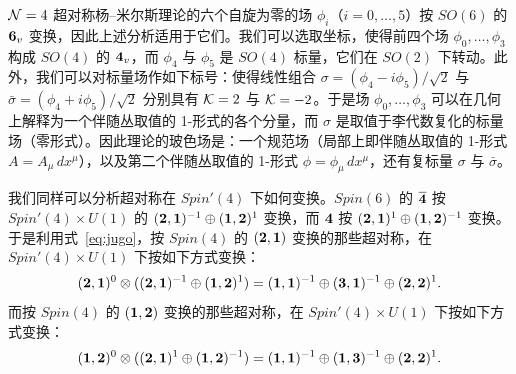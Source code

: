 ${\EUN}=4$ 超对称杨--米尔斯理论的六个自旋为零的场 $\phi_i$（$i=0,\dots,5$）按 $SO(6)$ 的 ${\bf 6_v}$ 变换，因此上述分析适用于它们。我们可以选取坐标，使得前四个场 $\phi_0,\dots,\phi_3$ 构成 $SO(4)$ 的 ${\bf 4_v}$，而 $\phi_4$ 与 $\phi_5$ 是 $SO(4)$ 标量，它们在 $SO(2)$ 下转动。此外，我们可以对标量场作如下标号：使得线性组合 $\sigma=(\phi_4-i\phi_5)/\sqrt 2$ 与 $\bar\sigma=(\phi_4+i\phi_5)/\sqrt 2$ 分别具有 ${\EUK}=2$ 与 ${\EUK}=-2$。于是场 $\phi_0,\dots,\phi_3$ 可以在几何上解释为一个伴随丛取值的 1-形式的各个分量，而 $\sigma$ 是取值于李代数复化的标量场（零形式）。因此理论的玻色场是：一个规范场（局部上即伴随丛取值的 1-形式 $A=A_\mu \,dx^\mu$），以及第二个伴随丛取值的 1-形式 $\phi=\phi_\mu\,dx^\mu$，还有复标量 $\sigma$ 与 $\bar\sigma$。

\par{}

我们同样可以分析超对称在 $Spin'(4)$ 下如何变换。$Spin(6)$ 的 $\bar{\bf 4}$ 按 $Spin'(4)\times U(1)$ 的 $({\bf 2},\bone)^{-1}\oplus(\bone,{\bf 2})^{1}$ 变换，而 ${\bf 4}$ 按 $({\bf 2},\bone)^{1}\oplus(\bone,{\bf 2})^{-1}$ 变换。于是利用式~\eqref{eq:jugo}，按 $Spin(4)$ 的 $({\bf 2},\bone)$ 变换的那些超对称，在 $Spin'(4)\times U(1)$ 下按如下方式变换： %
\setcounter{equation}{4}
\begin{equation}\label{eq:lollypop}
(\btwo,\bone)^0\otimes
((\btwo,\bone)^{-1}\oplus (\bone,\btwo)^{1}) =
(\bone,\bone)^{-1}\oplus ({\bf 3},\bone)^{-1}
\oplus(\btwo,\btwo)^{1}.
\end{equation}
而按 $Spin(4)$ 的 $(\bone,{\bf 2})$ 变换的那些超对称，在 $Spin'(4)\times U(1)$ 下按如下方式变换： %
\setcounter{equation}{5}
\begin{equation}\label{eq:tollypop}
(\bone,\btwo)^0\otimes
((\btwo,\bone)^{1}\oplus (\bone,\btwo)^{-1}) = (\bone,\bone)^{-1}
\oplus (\bone,{\bf 3})^{-1} \oplus(\btwo,\btwo)^{1}.
\end{equation}

